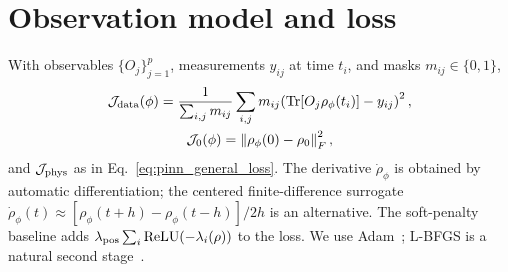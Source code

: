 \documentclass[twocolumn,aps,prxquantum,superscriptaddress,nofootinbib,floatfix,longbibliography]{revtex4-2}
\DeclareMathOperator{\Tr}{Tr}
\newcommand{\calJ}{\mathcal{J}}
\newcommand{\norm}[1]{\left\lVert #1 \right\rVert}
\newcommand{\rhophi}{\rho_{\phi}}
\begin{document}
\section{Observation model and loss}
\label{sec:loss}
With observables $\{O_j\}_{j=1}^{p}$, measurements $y_{ij}$ at time $t_i$, and masks $m_{ij}\in\{0,1\}$,
\begin{equation}
\begin{gathered}
    \calJ_{\rm data}(\phi)=\frac{1}{\sum_{i,j}m_{ij}}\sum_{i,j}m_{ij}\!\left(\Tr[O_j\rhophi(t_i)]-y_{ij}\right)^2,\\
    \calJ_0(\phi)=\norm{\rhophi(0)-\rho_0}_F^2,
\end{gathered}
    \label{eq:data_ic_loss}
\end{equation}
and $\calJ_{\rm phys}$ as in Eq.~\eqref{eq:pinn_general_loss}. The derivative $\dot\rhophi$ is obtained by automatic differentiation; the centered finite-difference surrogate $\dot\rhophi(t)\approx[\rhophi(t+h)-\rhophi(t-h)]/2h$ is an alternative. The soft-penalty baseline adds $\lambda_{\rm pos}\sum_i\mathrm{ReLU}(-\lambda_i(\rho))$ to the loss. We use Adam~\cite{kingma2015adam}; L-BFGS is a natural second stage~\cite{liu1989limited}.
\end{document}
